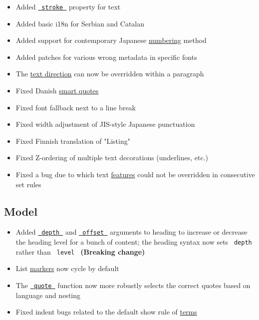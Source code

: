 \begin{itemize}
\tightlist
\item
  Added
  \href{/docs/reference/text/text/\#parameters-stroke}{\texttt{\ stroke\ }}
  property for text
\item
  Added basic i18n for Serbian and Catalan
\item
  Added support for contemporary Japanese
  \href{/docs/reference/model/numbering/}{numbering} method
\item
  Added patches for various wrong metadata in specific fonts
\item
  The \href{/docs/reference/text/text/\#parameters-dir}{text direction}
  can now be overridden within a paragraph
\item
  Fixed Danish \href{/docs/reference/text/smartquote/}{smart quotes}
\item
  Fixed font fallback next to a line break
\item
  Fixed width adjustment of JIS-style Japanese punctuation
\item
  Fixed Finnish translation of "Listing"
\item
  Fixed Z-ordering of multiple text decorations (underlines, etc.)
\item
  Fixed a bug due to which text
  \href{/docs/reference/text/text/\#parameters-features}{features} could
  not be overridden in consecutive set rules
\end{itemize}

\subsection{Model}\label{model}

\begin{itemize}
\tightlist
\item
  Added
  \href{/docs/reference/model/heading/\#parameters-depth}{\texttt{\ depth\ }}
  and
  \href{/docs/reference/model/heading/\#parameters-offset}{\texttt{\ offset\ }}
  arguments to heading to increase or decrease the heading level for a
  bunch of content; the heading syntax now sets \texttt{\ depth\ }
  rather than \texttt{\ level\ } \textbf{(Breaking change)}
\item
  List \href{/docs/reference/model/list/\#parameters-marker}{markers}
  now cycle by default
\item
  The \href{/docs/reference/model/quote/}{\texttt{\ quote\ }} function
  now more robustly selects the correct quotes based on language and
  nesting
\item
  Fixed indent bugs related to the default show rule of
  \href{/docs/reference/model/terms/}{terms}
\end{itemize}

